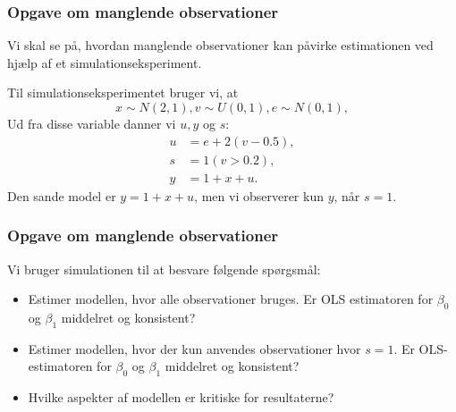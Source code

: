 \documentclass[aspectratio=43,t]{beamer}
\begin{document}

\begin{frame}
\frametitle{Opgave om manglende observationer}

	Vi skal se på, hvordan manglende observationer kan påvirke
	estimationen ved hjælp af et simulationseksperiment.
	
	Til simulationseksperimentet bruger vi, at 
	\begin{equation*}
	x\sim N(2,1),v\sim U(0,1),e\sim N(0,1),
	\end{equation*}
	Ud fra disse variable danner vi $u,y$ og $s$:
	\begin{align*}
	u &=e+2(v-0.5),  \\
	s &=1(v>0.2),     \\
	y &=1+x+u.
	\end{align*}
	Den sande model er $y=1+x+u$, men vi observerer kun $y$, når $s=1$.

\end{frame}


\begin{frame}
\frametitle{Opgave om manglende observationer}

	Vi bruger simulationen til at besvare følgende spørgsmål:

	\begin{itemize}
	\item Estimer modellen, hvor alle observationer bruges. Er OLS
	estimatoren for $\beta _{0}$ og $\beta _{1}$ middelret og konsistent?
	\medskip
	
	\item Estimer modellen, hvor der kun anvendes observationer 
	hvor $s=1$. Er OLS-estimatoren for $\beta _{0}$ og $\beta _{1}$
	middelret og konsistent?\medskip

	\item Hvilke aspekter af modellen er kritiske for resultaterne?
\end{itemize}

\end{frame}

\end{document}
